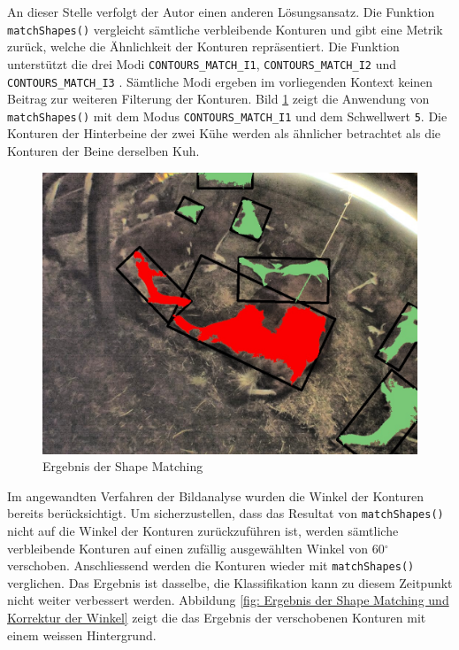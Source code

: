 An dieser Stelle verfolgt der Autor einen anderen Lösungsansatz. Die Funktion \texttt{matchShapes()} vergleicht sämtliche verbleibende Konturen und gibt eine Metrik zurück, welche die Ähnlichkeit der Konturen repräsentiert. Die Funktion unterstützt die drei Modi \texttt{CONTOURS_MATCH_I1}, \texttt{CONTOURS_MATCH_I2} und \texttt{CONTOURS_MATCH_I3} \citep[S. 392]{FernandezVillan2019}. Sämtliche Modi ergeben im vorliegenden Kontext keinen Beitrag zur weiteren Filterung der Konturen. Bild \ref{fig: Ergebnis der Shape Matching} zeigt die Anwendung von \texttt{matchShapes()} mit dem Modus \texttt{CONTOURS_MATCH_I1} und dem Schwellwert \texttt{5}. Die Konturen der Hinterbeine der zwei Kühe werden als ähnlicher betrachtet als die Konturen der Beine derselben Kuh. 

\begin{figure}[H]
	\center
	\includegraphics[scale=0.43]{Grafiken/entwicklung/31FilteredBySimilarity.jpg}
	\caption{Ergebnis der Shape Matching} 
	\label{fig: Ergebnis der Shape Matching} 
\end{figure}
Im angewandten Verfahren der Bildanalyse wurden die Winkel der Konturen bereits berücksichtigt. Um sicherzustellen, dass das Resultat von \texttt{matchShapes()} nicht auf die Winkel der Konturen zurückzuführen ist, werden sämtliche verbleibende Konturen auf einen zufällig ausgewählten Winkel von 60$^{\circ}$ verschoben. Anschliessend werden die Konturen wieder mit \texttt{matchShapes()} verglichen. Das Ergebnis ist dasselbe, die Klassifikation kann zu diesem Zeitpunkt nicht weiter verbessert werden. Abbildung \ref{fig: Ergebnis der Shape Matching und Korrektur der Winkel} zeigt die das Ergebnis der verschobenen Konturen mit einem weissen Hintergrund.
